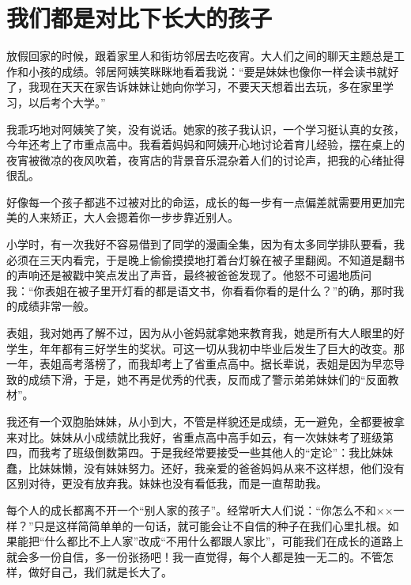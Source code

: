 
\section*{我们都是对比下长大的孩子}

放假回家的时候，跟着家里人和街坊邻居去吃夜宵。大人们之间的聊天主题总是工作和小孩的成绩。邻居阿姨笑眯眯地看着我说：“要是妹妹也像你一样会读书就好了，我现在天天在家告诉妹妹让她向你学习，不要天天想着出去玩，多在家里学习，以后考个大学。”

我乖巧地对阿姨笑了笑，没有说话。她家的孩子我认识，一个学习挺认真的女孩，今年还考上了市重点高中。我看着妈妈和阿姨开心地讨论着育儿经验，摆在桌上的夜宵被微凉的夜风吹着，夜宵店的背景音乐混杂着人们的讨论声，把我的心绪扯得很乱。

好像每一个孩子都逃不过被对比的命运，成长的每一步有一点偏差就需要用更加完美的人来矫正，大人会摁着你一步步靠近别人。

小学时，有一次我好不容易借到了同学的漫画全集，因为有太多同学排队要看，我必须在三天内看完，于是晚上偷偷摸摸地打着台灯躲在被子里翻阅。不知道是翻书的声响还是被戳中笑点发出了声音，最终被爸爸发现了。他怒不可遏地质问我：“你表姐在被子里开灯看的都是语文书，你看看你看的是什么？”的确，那时我的成绩非常一般。

表姐，我对她再了解不过，因为从小爸妈就拿她来教育我，她是所有大人眼里的好学生，年年都有三好学生的奖状。可这一切从我初中毕业后发生了巨大的改变。那一年，表姐高考落榜了，而我却考上了省重点高中。据长辈说，表姐是因为早恋导致的成绩下滑，于是，她不再是优秀的代表，反而成了警示弟弟妹妹们的“反面教材”。

我还有一个双胞胎妹妹，从小到大，不管是样貌还是成绩，无一避免，全都要被拿来对比。妹妹从小成绩就比我好，省重点高中高手如云，有一次妹妹考了班级第四，而我考了班级倒数第四。于是我经常要接受一些其他人的“定论”：我比妹妹蠢，比妹妹懒，没有妹妹努力。还好，我亲爱的爸爸妈妈从来不这样想，他们没有区别对待，更没有放弃我。妹妹也没有看低我，而是一直帮助我。

每个人的成长都离不开一个“别人家的孩子”。经常听大人们说：“你怎么不和××一样？”只是这样简简单单的一句话，就可能会让不自信的种子在我们心里扎根。如果能把“什么都比不上人家”改成“不用什么都跟人家比”，可能我们在成长的道路上就会多一份自信，多一份张扬吧！我一直觉得，每个人都是独一无二的。不管怎样，做好自己，我们就是长大了。
